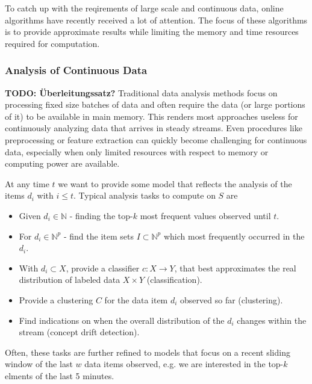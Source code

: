 To catch up with the reqirements of large scale and continuous data,
online algorithms have recently received a lot of attention. The focus
of these algorithms is to provide approximate results while limiting
the memory and time resources required for computation. 


\subsubsection*{Analysis of Continuous Data}
{\bf TODO: \"{U}berleitungssatz?}
Traditional data analysis methods focus on processing fixed size
batches of data and often require the data (or large portions of it)
to be available in main memory. This renders most approaches useless
for continuously analyzing data that arrives in steady streams. Even
procedures like preprocessing or feature extraction can quickly become
challenging for continuous data, especially when only limited
resources with respect to memory or computing power are available.

At any time $t$ we want to provide some model that reflects the
analysis of the items $d_i$ with $i\le t$.  Typical analysis tasks to
compute on $S$ are
\begin{itemize}
\item Given $d_i \in \mathbb{N}$ - finding the top-$k$ most frequent
  values observed until $t$.
\item For $d_i \in \mathbb{N}^p$ - find the item sets $I \subset
  \mathbb{N}^p$ which most frequently occurred in the $d_i$.
\item With $d_i \subset X$, provide a classifier $c:X \rightarrow Y$,
  that best approximates the real distribution of labeled data $X
  \times Y$ (classification).
\item Provide a clustering $C$ for the data item $d_i$ observed so far (clustering).
\item Find indications on when the overall distribution of the $d_i$
  changes within the stream (concept drift detection).
\end{itemize}
Often, these tasks are further refined to models that focus on a
recent sliding window of the last $w$ data items observed, e.g. we are
interested in the top-$k$ elments of the last 5 minutes. 

